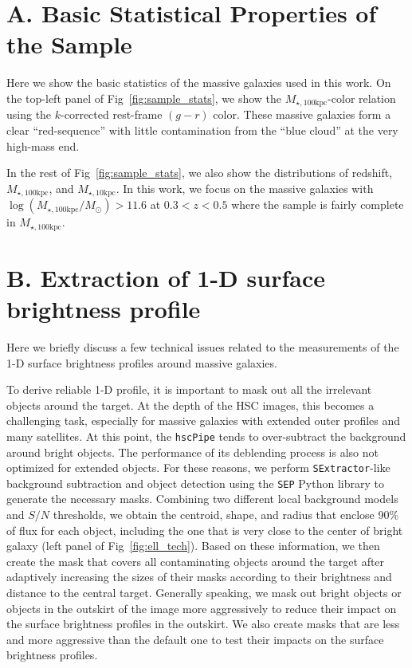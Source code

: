 \documentclass[a4paper,fleqn,usenatbib]{mnras}
\def\minn{{$M_{\star,10\mathrm{kpc}}$}}
\def\mtot{{$M_{\star,100\mathrm{kpc}}$}}
\def\logmtot{{$\log (M_{\star,100\mathrm{kpc}}/M_{\odot})$}}
\begin{document}
\section{A. Basic Statistical Properties of the Sample} 
	\label{app:basic} 
    
    Here we show the basic statistics of the massive galaxies used in this work.
    On the top-left panel of Fig~\ref{fig:sample_stats}, we show the \mtot{}-color 
    relation using the $k$-corrected rest-frame $(g-r)$ color. 
    These massive galaxies form a clear ``red-sequence'' with little contamination 
    from the ``blue cloud'' at the very high-mass end.
    
    In the rest of Fig~\ref{fig:sample_stats}, we also show the distributions of 
    redshift, \mtot{}, and \minn{}.
    In this work, we focus on the massive galaxies with \logmtot{}$>11.6$ at 
    $0.3 < z < 0.5$ where the sample is fairly complete in \mtot{}.
    
\section{B. Extraction of 1-D surface brightness profile} 
    \label{app:ellipse} 
    
    Here we briefly discuss a few technical issues related to the measurements of the 
    1-D surface brightness profiles around massive galaxies. 
    
    To derive reliable 1-D profile, it is important to mask out all the irrelevant 
    objects around the target.
    At the depth of the HSC images, this becomes a challenging task, especially 
    for massive galaxies with extended outer profiles and many satellites. 
    At this point, the \texttt{hscPipe} tends to over-subtract the background around 
    bright objects.  
    The performance of its deblending process is also not optimized for extended
    objects. 
    For these reasons, we perform \texttt{SExtractor}-like background subtraction and 
    object detection using the \texttt{SEP} Python library to generate the necessary 
    masks.
    Combining two different local background models and $S/N$ thresholds, we obtain 
    the centroid, shape, and radius that enclose 90\% of flux for each object, 
    including the one that is very close to the center of bright galaxy (left panel of 
    Fig~\ref{fig:ell_tech}). 
    Based on these information, we then create the mask that covers all contaminating 
    objects around the target after adaptively increasing the sizes of their masks 
    according to their brightness and distance to the central target. 
    Generally speaking, we mask out bright objects or objects in the outskirt of the 
    image more aggressively to reduce their impact on the surface brightness profiles 
    in the outskirt. 
    We also create masks that are less and more aggressive than the default one to 
    test their impacts on the surface brightness profiles. 
    
\end{document}
